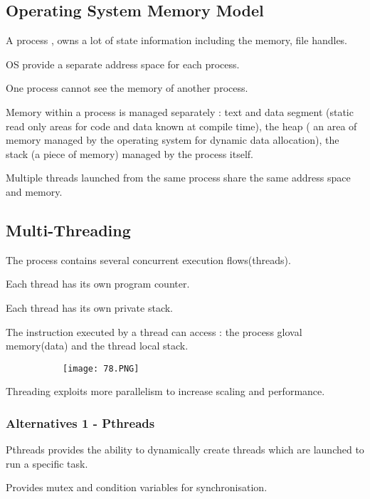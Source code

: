 \documentclass{article}
\begin{document}
\subsection{Operating System Memory Model}

A process , owns a lot of state information including the memory, file handles.

OS provide a separate address space for each process.

One process cannot see the memory of another process. 

Memory within a process is managed separately : text and data segment (static read only areas for code and data known at compile time), the heap ( an area of memory managed by the operating system for dynamic data allocation), the stack (a piece of memory) managed by the process itself.

Multiple threads launched from the same process share the same address space and memory.

\subsection{Multi-Threading}

The process contains several concurrent execution flows(threads).

Each thread has its own program counter.

Each thread has its own private stack.

The instruction executed by a thread can access : the process gloval memory(data) and the thread local stack.

\begin{figure}[ht!]
  \centering
  \begin{subfigure}[b]{0.4\linewidth}
    \texttt{[image: 78.PNG]}
  \end{subfigure}
\end{figure}

Threading exploits more parallelism to increase scaling and performance.

\subsubsection{Alternatives 1 - Pthreads}

Pthreads provides the ability to dynamically create threads which are launched to run a specific task.

Provides mutex and condition variables for synchronisation.
\end{document}
